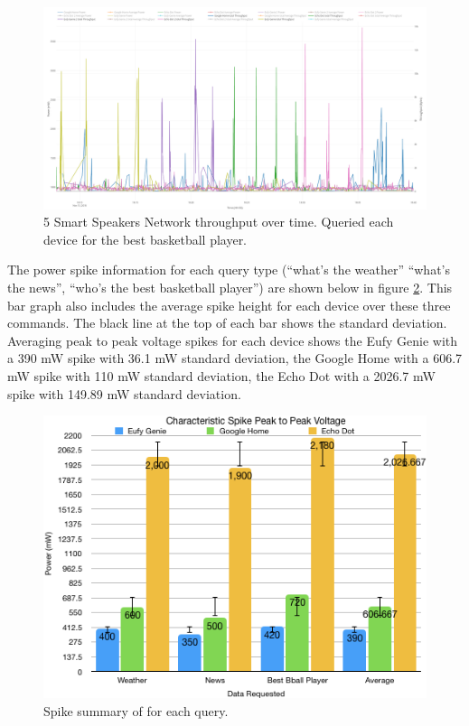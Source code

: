 \begin{figure}[H]
  \centering
  \includegraphics[width=1\textwidth]{figures/bestBballNetwork.png}
  \caption{5 Smart Speakers Network throughput over time. Queried each device for the best basketball player.}
  \label{fig:bestBballNetwork}
\end{figure}

The power spike information for each query type (``what's the weather'' ``what's the news'', ``who's the best basketball player'') are shown below in figure \ref{fig:spikeVoltages}. This bar graph also includes the average spike height for each device over these three commands. The black line at the top of each bar shows the standard deviation. Averaging peak to peak voltage spikes for each device shows the Eufy Genie with a 390 mW spike with 36.1 mW standard deviation, the Google Home with a 606.7 mW spike with 110 mW standard deviation, the Echo Dot with a 2026.7 mW spike with 149.89 mW standard deviation.

\begin{figure}[H]
  \centering
  \includegraphics[width=1\textwidth]{figures/spikeVoltages.png}
  \caption{Spike summary of for each query.}
  \label{fig:spikeVoltages}
\end{figure}

